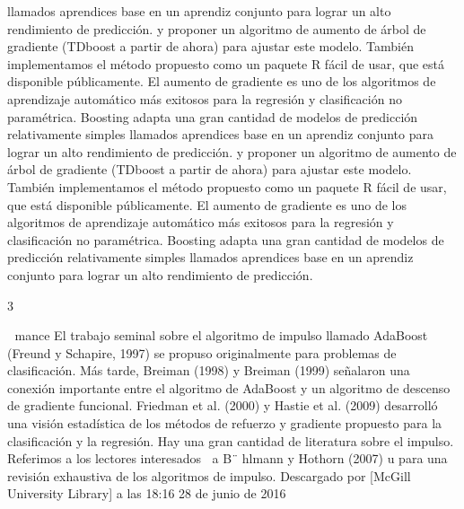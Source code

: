 \documentclass[]{article}
\begin{document}
llamados aprendices base en un aprendiz conjunto para lograr un alto
rendimiento de predicción. y proponer un algoritmo de aumento de árbol
de gradiente (TDboost a partir de ahora) para ajustar este modelo.
También implementamos el método propuesto como un paquete R fácil de
usar, que está disponible públicamente. El aumento de gradiente es uno
de los algoritmos de aprendizaje automático más exitosos para la
regresión y clasificación no paramétrica. Boosting adapta una gran
cantidad de modelos de predicción relativamente simples llamados
aprendices base en un aprendiz conjunto para lograr un alto rendimiento
de predicción. y proponer un algoritmo de aumento de árbol de gradiente
(TDboost a partir de ahora) para ajustar este modelo. También
implementamos el método propuesto como un paquete R fácil de usar, que
está disponible públicamente. El aumento de gradiente es uno de los
algoritmos de aprendizaje automático más exitosos para la regresión y
clasificación no paramétrica. Boosting adapta una gran cantidad de
modelos de predicción relativamente simples llamados aprendices base en
un aprendiz conjunto para lograr un alto rendimiento de predicción.

3

 mance El trabajo seminal sobre el algoritmo de impulso llamado
AdaBoost (Freund y Schapire, 1997) se propuso originalmente para
problemas de clasificación. Más tarde, Breiman (1998) y Breiman (1999)
señalaron una conexión importante entre el algoritmo de AdaBoost y un
algoritmo de descenso de gradiente funcional. Friedman et al. (2000) y
Hastie et al. (2009) desarrolló una visión estadística de los métodos de
refuerzo y gradiente propuesto para la clasificación y la regresión. Hay
una gran cantidad de literatura sobre el impulso. Referimos a los
lectores interesados a B¨ hlmann y Hothorn (2007) u para una revisión
exhaustiva de los algoritmos de impulso. Descargado por {[}McGill
University Library{]} a las 18:16 28 de junio de 2016
\end{document}
